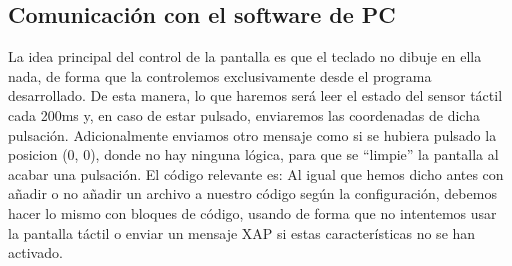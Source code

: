 \subsection{Comunicación con el software de PC}
La idea principal del control de la pantalla es que el teclado no dibuje en ella nada, de forma que la controlemos exclusivamente desde el programa desarrollado. De esta manera, lo que haremos será leer el estado del sensor táctil cada 200ms y, en caso de estar pulsado, enviaremos las coordenadas de dicha pulsación. Adicionalmente enviamos otro mensaje como si se hubiera pulsado la posicion (0, 0), donde no hay ninguna lógica, para que se ``limpie'' la pantalla al acabar una pulsación. El código relevante es: 
Al igual que hemos dicho antes con añadir o no añadir un archivo a nuestro código según la configuración, debemos hacer lo mismo con bloques de código, usando  de forma que no intentemos usar la pantalla táctil o enviar un mensaje XAP si estas características no se han activado.

